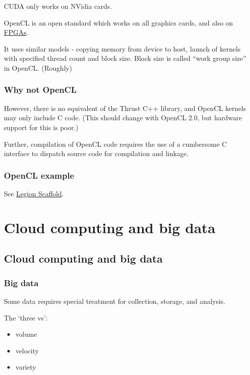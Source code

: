 CUDA only works on NVidia cards.

OpenCL is an open standard which works on all graphics cards, and also
on
\href{https://en.wikipedia.org/wiki/Field-programmable_gate_array}{FPGAs}.

It uses similar models - copying memory from device to host, launch of
kernels with specified thread count and block size. Block size is called
``work group size'' in OpenCL. (Roughly)

\subsubsection{Why not OpenCL}\label{why-not-opencl}

However, there is no equivalent of the Thrust C++ library, and OpenCL
kernels may only include C code. (This should change with OpenCL 2.0,
but hardware support for this is poor.)

Further, compilation of OpenCL code requires the use of a cumbersome C
interface to dispatch source code for compilation and linkage.

\subsubsection{OpenCL example}\label{opencl-example}

See
\href{https://github.com/UCL-RITS/Legion-Fabric-Scaffold/blob/opencl/src/cl_main.cpp}{Legion
Scaffold}.

\section{Cloud computing and big
data}\label{cloud-computing-and-big-data}

\subsection{Cloud computing and big
data}\label{cloud-computing-and-big-data-1}

\subsubsection{Big data}\label{big-data}

Some data requires special treatment for collection, storage, and
analysis.

The `three vs':

\begin{itemize}
\itemsep1pt\parskip0pt
\item
  volume
\item
  velocity
\item
  variety
\end{itemize}

